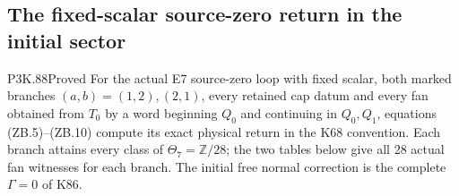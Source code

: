 \subsection{The fixed-scalar source-zero return in the initial sector}
\begin{statement}{P3K.88}{Proved}
For the actual E7 source-zero loop with fixed scalar, both marked
branches \((a,b)=(1,2),(2,1)\), every retained cap datum and every fan
obtained from \(T_0\) by a word beginning \(Q_0\) and continuing in
\(Q_0,Q_1\), equations (ZB.5)--(ZB.10) compute its exact physical
return in the K68 convention. Each branch attains every class of
\(\Theta_7=\mathbb Z/28\); the two tables below give all 28 actual
fan witnesses for each branch. The initial free normal correction
is the complete \(\Gamma=0\) of K86.
\end{statement}

